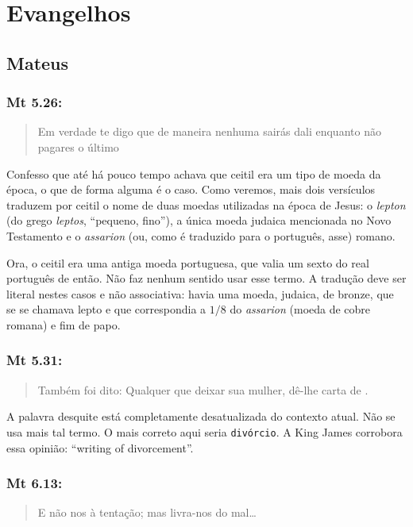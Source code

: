 \chapter{Evangelhos}
\section{Mateus}
\subsection*{Mt 5.26:}\label{ceitil}
\begin{quote}
 \small
 Em verdade te digo que de maneira nenhuma sairás dali enquanto não pagares o último 
\end{quote}

Confesso que até há pouco tempo achava que ceitil era um tipo de moeda
da época, o que de forma alguma é o caso. Como veremos, mais dois
versículos traduzem por ceitil o nome de duas moedas utilizadas na
época de Jesus: o \emph{lepton} (do grego \emph{leptos}, ``pequeno,
fino''), a única moeda judaica mencionada no Novo Testamento e o
\emph{assarion} (ou, como é traduzido para o português, asse) romano.

Ora, o ceitil era uma antiga moeda portuguesa, que valia um sexto do
real português de então. Não faz nenhum sentido usar esse termo. A
tradução deve ser literal nestes casos e não associativa: havia
uma moeda, judaica, de bronze, que se se chamava lepto e que
correspondia a $1/8$ do \emph{assarion} (moeda de cobre romana) e fim
de papo.

\subsection*{Mt 5.31:}
\begin{quote}
 \small
 Também foi dito: Qualquer que deixar sua mulher, dê-lhe carta de .
\end{quote}

A palavra desquite está completamente desatualizada do contexto atual. Não se usa mais tal termo. O mais correto aqui seria \texttt{divórcio}. A King James corrobora essa opinião: ``writing of divorcement''.

\subsection*{Mt 6.13:}
\begin{quote}
 \small
 E não nos  à tentação; mas livra-nos do mal\ldots
\end{quote}

